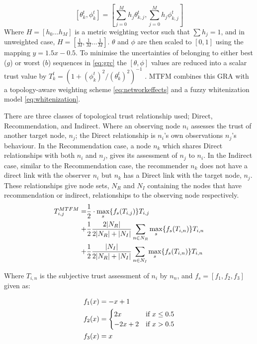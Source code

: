 \documentclass[conference]{IEEEtran}
\begin{document}
%
\begin{equation}
  \label{eq:metric_weighting}
  [\theta_k^t, \phi_k^t] = \left[\sum_{j=0}^M h_j \theta_{k,j}^t,\sum_{j=0}^M h_j \phi_{k,j}^t \right]
\end{equation}
%
Where $H=[h_0\dots h_M]$ is a metric weighting vector such that $\sum h_j = 1$, and in unweighted case, $H=[\frac{1}{M},\frac{1}{M}\dots\frac{1}{M}]$.
$\theta$ and $\phi$ are then scaled to $[0,1]$ using the mapping $y = 1.5 x - 0.5$.
To minimise the uncertainties of belonging to either best ($g$) or worst ($b$) sequences in \eqref{eq:grc} the $[\theta,\phi]$ values are reduced into a scalar trust value by $T_k^t = ({1+{(\phi_k^t)^2}/{(\theta_k^t)^2}})^{-1}$ \cite{Hong2010}.
MTFM combines this GRA with a topology-aware weighting scheme \eqref{eq:networkeffects} and a fuzzy whitenization model \eqref{eq:whitenization}. 

There are three classes of topological trust relationship used; Direct, Recommendation, and Indirect.
Where an observing node $n_i$ assesses the trust of another target node, $n_j$; the Direct relationship is $n_i$'s own observations $n_j$'s behaviour.
In the Recommendation case, a node $n_k$ which shares Direct relationships with both $n_i$ and $n_j$, gives its assessment of $n_j$ to $n_i$.
In the Indirect case, similar to the Recommendation case, the recommender $n_k$ does not have a direct link with the observer $n_i$ but $n_k$ has a Direct link with the target node, $n_j$.
These relationships give node sets, $N_R$ and $N_I$ containing the nodes that have recommendation or indirect, relationships to the observing node respectively.
%
\begin{align}
  \label{eq:networkeffects}
  T_{i,j}^{MTFM}=&\frac{1}{2} \cdot \max_s\{f_s(T_{i,j})\} T_{i,j}\\ \notag
  +&\frac{1}{2} \frac{2|N_R| }{2|N_R| + |N_I|}\sum_{n \in N_R} \max_s\{f_s(T_{i,n})\} T_{i,n}\\ \notag
  +&\frac{1}{2} \frac{|N_I| }{2|N_R| + |N_I|}\sum_{n \in N_I} \max_s\{f_s(T_{i,n})\} T_{i,n} 
\end{align}

Where $T_{i,n}$ is the subjective trust assessment of $n_i$ by $n_n$, and $f_s = [ f_1,f_2, f_3]$ given as:

\begin{align}
  \label{eq:whitenization}
  f_1(x)&= -x+1\notag\\
  f_2(x)&= 
  \begin{cases}
    2x & \text{if }x\leq 0.5\\
    -2x+2 & \text{if }x>0.5
  \end{cases}\\
  f_3(x)&= x\notag
\end{align}
%
\end{document}
